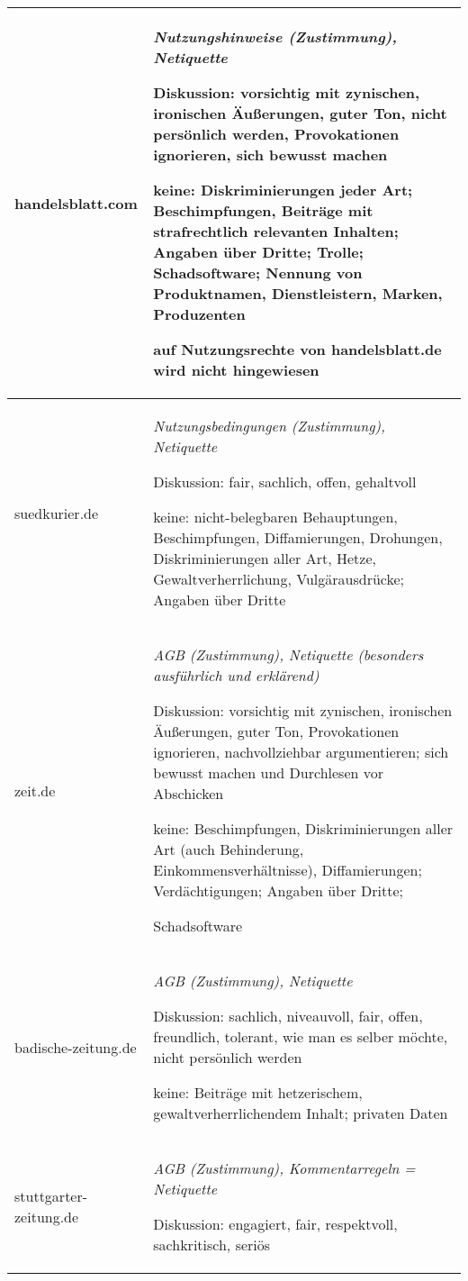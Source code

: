 \begin{longtable}{p{28mm}p{110mm}}
handelsblatt.com & \emph{Nutzungshinweise (Zustimmung), Netiquette}

  Diskussion: vorsichtig mit zynischen, ironischen Äußerungen, guter Ton, nicht
  persönlich werden, Provokationen ignorieren, sich bewusst machen

  keine: Diskriminierungen jeder Art;  Beschimpfungen, Beiträge mit
  strafrechtlich relevanten Inhalten; Angaben über Dritte;
  Trolle; Schadsoftware; Nennung von Produktnamen, Dienstleistern, Marken,
  Produzenten

  auf Nutzungsrechte von handelsblatt.de wird nicht
  hingewiesen\\*\midrule

suedkurier.de & \emph{Nutzungsbedingungen (Zustimmung), Netiquette}

  Diskussion: fair, sachlich, offen, gehaltvoll

  keine: nicht-belegbaren Behauptungen, Beschimpfungen, Diffamierungen,
  Drohungen, Diskriminierungen aller Art, Hetze, Gewaltverherrlichung,
  Vulgärausdrücke;  Angaben über Dritte
  \\*\midrule

zeit.de & \emph{AGB (Zustimmung), Netiquette (besonders ausführlich und erklärend)}

  Diskussion: vorsichtig mit zynischen, ironischen Äußerungen, guter Ton,
  Provokationen ignorieren, nachvollziehbar argumentieren; sich bewusst machen
  und Durchlesen vor Abschicken

  keine: Beschimpfungen, Diskriminierungen aller Art (auch Behinderung,
  Einkommensverhältnisse), Diffamierungen; Verdächtigungen; Angaben über Dritte;

  Schadsoftware
  \\*\midrule

badische-zeitung.de & \emph{AGB (Zustimmung), Netiquette}

  Diskussion: sachlich, niveauvoll, fair, offen, freundlich, tolerant, wie man
  es selber möchte, nicht persönlich werden

  keine: Beiträge mit hetzerischem, gewaltverherrlichendem Inhalt; privaten
  Daten
  \\*\midrule

stuttgarter-zeitung.de & \emph{AGB (Zustimmung), Kommentarregeln = Netiquette}

	Diskussion: engagiert, fair, respektvoll, sachkritisch, seriös
	

\end{longtable}

